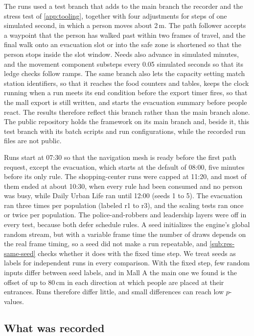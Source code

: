 The runs used a test branch that adds to the main branch the recorder and the stress test of \cref{app:tooling}, together with four adjustments for steps of one simulated second, in which a person moves about 2\,m. The path follower accepts a waypoint that the person has walked past within two frames of travel, and the final walk onto an evacuation slot or into the safe zone is shortened so that the person stops inside the slot window. Needs also advance in simulated minutes, and the movement component substeps every 0.05 simulated seconds so that its ledge checks follow ramps. The same branch also lets the capacity setting match station identifiers, so that it reaches the food counters and tables, keeps the clock running when a run meets its end condition before the export timer fires, so that the mall export is still written, and starts the evacuation summary before people react. The results therefore reflect this branch rather than the main branch alone. The public repository \citep{armada2026repository} holds the framework on its main branch and, beside it, this test branch with its batch scripts and run configurations, while the recorded run files are not public.

Runs start at 07:30 so that the navigation mesh is ready before the first path request, except the evacuation, which starts at the default of 08:00, five minutes before its only rule. The shopping-center runs were capped at 11:20, and most of them ended at about 10:30, when every rule had been consumed and no person was busy, while Daily Urban Life ran until 12:00 (seeds 1 to 5). The evacuation ran three times per population (labeled r1 to r3), and the scaling tests ran once or twice per population. The police-and-robbers and leadership layers were off in every test, because both defer schedule rules. A seed initializes the engine's global random stream, but with a variable frame time the number of draws depends on the real frame timing, so a seed did not make a run repeatable, and \cref{sub:res-same-seed} checks whether it does with the fixed time step. We treat seeds as labels for independent runs in every comparison. With the fixed step, few random inputs differ between seed labels, and in Mall A the main one we found is the offset of up to 80\,cm in each direction at which people are placed at their entrances. Runs therefore differ little, and small differences can reach low $p$-values.

\subsection{What was recorded}
\label{sub:app-recording}

